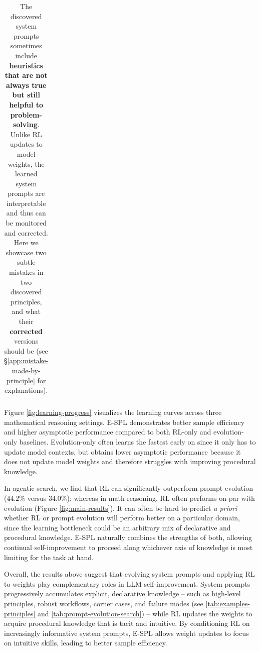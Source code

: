 \documentclass{article}
\theoremstyle{plain}
\theoremstyle{definition}
\theoremstyle{remark}
\begin{document}
\begin{table}[t]
\begin{tabular}{%
  p{}|
  >{\raggedright\arraybackslash\renewcommand{\baselinestretch}{1.15}\selectfont}p{}
}
\\
\bottomrule
\end{tabular}
\vspace{3pt}
\caption{
The discovered system prompts sometimes include \textbf{heuristics that are {\color{Brown}not always true} but still helpful to problem-solving}. Unlike RL updates to model weights, the learned system prompts are interpretable and thus can be monitored and corrected. Here we showcase two subtle mistakes in two discovered principles, and what their {\color{MidnightBlue}\textbf{corrected}} versions should be (see \S\ref{app:mistake-made-by-principle} for explanations).}
\vspace{-14pt}
\label{tab:corrected-principles}
\end{table}



Figure \ref{fig:learning-progress} visualizes the learning curves across three mathematical reasoning settings. E-SPL demonstrates better sample efficiency and higher asymptotic performance compared to both RL-only and evolution-only baselines. Evolution-only often learns the fastest early on since it only has to update model contexts, but obtains lower asymptotic performance because it does not update model weights and therefore struggles with improving procedural knowledge.

In agentic search, we find that RL can significantly outperform prompt evolution ($44.2\%$ versus $34.0\%$); whereas in math reasoning, RL often performs on-par with evolution (Figure \ref{fig:main-results}). It can often be hard to predict \textit{a priori} whether RL or prompt evolution will perform better on a particular domain, since the learning bottleneck could be an arbitrary mix of declarative and procedural knowledge. E-SPL naturally combines the strengths of both, allowing continual self-improvement to proceed along whichever axis of knowledge is most limiting for the task at hand.

Overall, the results above suggest that evolving system prompts and applying RL to weights play complementary roles in LLM self-improvement. System prompts progressively accumulates explicit, declarative knowledge -- such as high-level principles, robust workflows, corner cases, and failure modes (see \autoref{tab:examples-principles} and \autoref{tab:prompt-evolution-search}) -- while RL updates the weights to acquire procedural knowledge that is tacit and intuitive. By conditioning RL on increasingly informative system prompts, E-SPL allows weight updates to focus on intuitive skills, leading to better sample efficiency.
\end{document}
